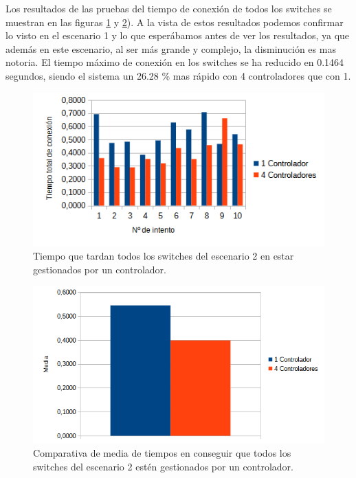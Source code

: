 \documentclass[a4paper, 12pt]{book}
\begin{document}
 	Los resultados de las pruebas del tiempo de conexión de todos los switches se muestran en las figuras \ref{figura:comparativamesh} y \ref{figura:mediamesh}). A la vista de estos resultados podemos confirmar lo visto en el escenario 1 y lo que esperábamos antes de ver los resultados, ya que además en este escenario, al ser más grande y complejo, la disminución es mas notoria. El tiempo máximo de conexión en los switches se ha reducido en 0.1464 segundos, siendo el sistema un 26.28 \% mas rápido con 4 controladores que con 1.
 	
 	\begin{figure}[H]
 		\centering
 		\includegraphics[width=16cm, keepaspectratio]{img/comparativamesh}
 		\caption{Tiempo que tardan todos los switches del escenario 2 en estar gestionados por un controlador.}
 		\label{figura:comparativamesh}
 	\end{figure}
 	
 	
 	\begin{figure}[H]
 		\centering
 		\includegraphics[width=12cm, keepaspectratio]{img/comparativamediamesh}
 		\caption{Comparativa de media de tiempos en conseguir que todos los switches del escenario 2 estén gestionados por un controlador.}
 		\label{figura:mediamesh}
 	\end{figure}
 	
\end{document}
